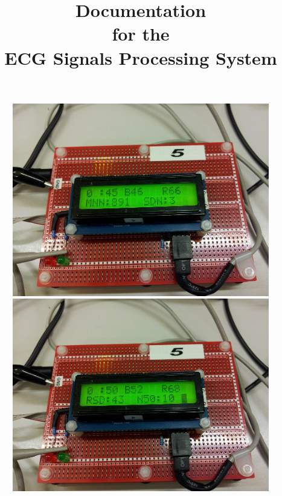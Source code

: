 \documentclass[11pt]{article}
\begin{document}
%
\title{Documentation\\for the\\ECG Signals Processing System}%
\maketitle
\begin{figure}[H]
\begin{minipage}{0.5\textwidth}
\centering
\includegraphics[width=\textwidth]{figs/screen1.jpg}
\end{minipage}
%
\begin{minipage}{0.5\textwidth}
\centering
\includegraphics[width=\textwidth]{figs/screen2.jpg}
\end{minipage}
\end{figure}
\end{document}
